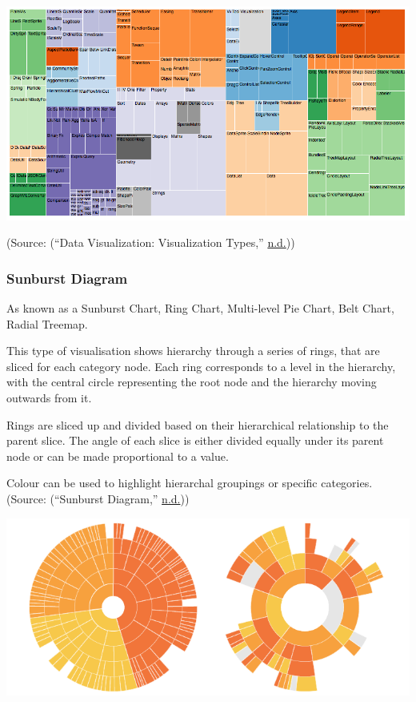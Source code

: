 \documentclass[]{book}
\begin{document}
\includegraphics{images/treemap.png}

(Source: (``Data Visualization: Visualization Types,'' \protect\hyperlink{ref-treemap}{n.d.}))

\hypertarget{sunburst-diagram}{%
\subsubsection{Sunburst Diagram}\label{sunburst-diagram}}

As known as a Sunburst Chart, Ring Chart, Multi-level Pie Chart, Belt Chart, Radial Treemap.

This type of visualisation shows hierarchy through a series of rings, that are sliced for each category node. Each ring corresponds to a level in the hierarchy, with the central circle representing the root node and the hierarchy moving outwards from it.

Rings are sliced up and divided based on their hierarchical relationship to the parent slice. The angle of each slice is either divided equally under its parent node or can be made proportional to a value.

Colour can be used to highlight hierarchal groupings or specific categories.
(Source: (``Sunburst Diagram,'' \protect\hyperlink{ref-sunburst-diag}{n.d.}))

\includegraphics{images/sunburst_diagram.png}
\end{document}
